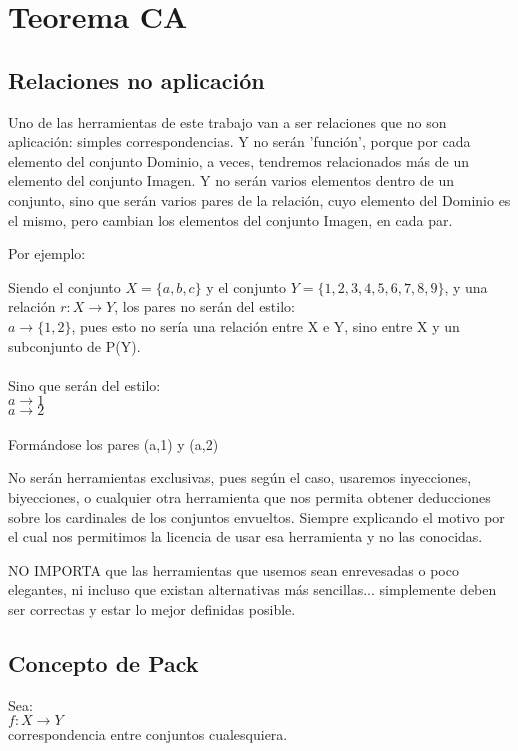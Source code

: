 \chapter{Teorema CA}

\newpage
\section{Relaciones no aplicación}
Uno de las herramientas de este trabajo van a ser relaciones que no son aplicación: simples correspondencias. Y no serán 'función', porque por cada elemento del conjunto Dominio, a veces, tendremos relacionados más de un elemento del conjunto Imagen. Y no serán varios elementos dentro de un conjunto, sino que serán varios pares de la relación, cuyo elemento del Dominio es el mismo, pero cambian los elementos del conjunto Imagen, en cada par.

Por ejemplo:

\noindent Siendo el conjunto $X=\{a,b,c\}$ y el conjunto $Y=\{1,2,3,4,5,6,7,8,9\}$, y una relación $r:X \rightarrow Y$, los pares no serán del estilo:\\
$a \rightarrow \{1,2\}$, pues esto no sería una relación entre X e Y, sino entre X y un subconjunto de P(Y).\\\\
\noindent Sino que serán del estilo:\\
$a \rightarrow 1$\\
$a \rightarrow 2$\\\\
\noindent Formándose los pares (a,1) y (a,2)

No serán herramientas exclusivas, pues según el caso, usaremos inyecciones, biyecciones, o cualquier otra herramienta que nos permita obtener deducciones sobre los cardinales de los conjuntos envueltos. Siempre explicando el motivo por el cual nos permitimos la licencia de usar esa herramienta y no las conocidas. 

NO IMPORTA que las herramientas que usemos sean enrevesadas o poco elegantes, ni incluso que existan alternativas más sencillas... simplemente deben ser correctas y estar lo mejor definidas posible.

\newpage
\section{Concepto de Pack}
\noindent
Sea:\\ 
$f:X \rightarrow Y$\\ 
correspondencia entre conjuntos cualesquiera.\\

